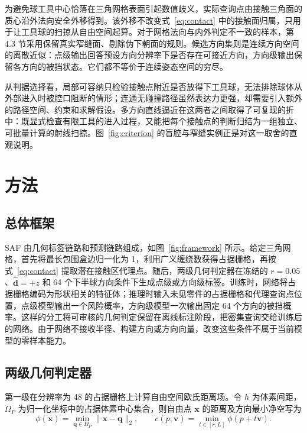 为避免球工具中心恰落在三角网格表面引起数值歧义，实际查询点由接触三角面的质心沿外法向安全外移得到。该外移不改变式~\eqref{eq:contact} 中的接触面归属，只用于让工具球的扫掠从自由空间起算。对于网格法向与内外判定不一致的样本，第 4.3 节采用保留真实窄缝面、剔除伪下朝面的规则。候选方向集则是连续方向空间的离散近似：点级输出回答预设方向分辨率下是否存在可接近方向，方向级输出保留各方向的被挡状态。它们都不等价于连续姿态空间的穷尽。

从判据选择看，局部可容纳只检验接触点附近是否放得下工具球，无法排除球体从外部进入时被腔口阻断的情形；连通无碰撞路径虽然表达力更强，却需要引入额外的路径空间、约束和求解假设。多方向直线逼近在这两者之间取得了可复现的折中：既显式检查有限工具的进入过程，又能把每个接触点的判断归结为一组独立、可批量计算的射线扫掠。图~\ref{fig:criterion} 的盲腔与窄缝实例正是对这一取舍的直观说明。

\section{方法}

\subsection{总体框架}

SAF 由几何标签链路和预测链路组成，如图~\ref{fig:framework} 所示。给定三角网格，首先将最长包围盒边归一化为 1，利用广义缠绕数获得占据栅格，再按式~\eqref{eq:contact} 提取潜在接触区代理点。随后，两级几何判定器在冻结的 $r=0.05$、$\hat{\mathbf d}=+z$ 和 64 个下半球方向条件下生成点级或方向级标签。训练时，网络将占据栅格编码为形状相关的特征体；推理时输入未见零件的占据栅格和代理查询点位置，点级模型输出一个风险概率，方向级模型一次输出固定 64 个方向的被挡概率。这样的分工将可审核的几何判定保留在离线标注阶段，把密集查询交给训练后的网络。由于网络不接收半径、构建方向或方向向量，改变这些条件不属于当前模型的零样本能力。

\subsection{两级几何判定器}

第一级在分辨率为 48 的占据栅格上计算自由空间欧氏距离场。令 $h$ 为体素间距，$\Omega_P$ 为归一化坐标中的占据体素中心集合，则自由点 $\mathbf x$ 的距离及方向最小净空写为
\begin{equation}
\phi(\mathbf x)=\min_{\mathbf q\in\Omega_P}\|\mathbf x-\mathbf q\|_2,
\qquad
c(p,\mathbf v)=\min_{t\in[r,L]}\phi(p+t\mathbf v).
\label{eq:clearance}
\end{equation}

